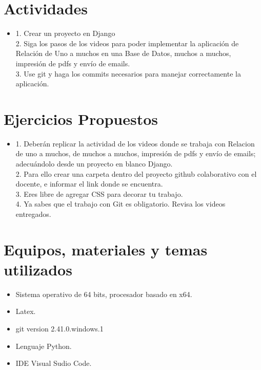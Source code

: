 \documentclass{article}
\begin{document}
	\section{Actividades}
	\begin{itemize}		
		\item 1. Crear un proyecto en Django\\
		2. Siga los pasos de los videos para poder implementar la aplicación de Relación de Uno a muchos en una Base de Datos, muchos a muchos, impresión de pdfs y envío de emails.\\
		3. Use git y haga los commits necesarios para manejar correctamente la aplicación.\\
		
		
	\end{itemize}
	
	\section{Ejercicios Propuestos}
	\begin{itemize}	
	
		\item 1. Deberán replicar la actividad de los videos donde se trabaja con Relacion de uno a muchos, de muchos a muchos, impresión de pdfs y envío de emails;  adecuándolo desde un proyecto en blanco Django.\\
		2. Para ello crear una carpeta dentro del proyecto github colaborativo con el docente, e informar el link donde se encuentra.\\
		3. Eres libre de agregar CSS para decorar tu trabajo.\\
		4. Ya sabes que el trabajo con Git es obligatorio.  Revisa los videos entregados.
		
		
	\end{itemize}
	
	\section{Equipos, materiales y temas utilizados}
	\begin{itemize}
		\item Sistema operativo de 64 bits, procesador basado en x64.
		\item Latex. 
		\item git version 2.41.0.windows.1
		\item Lenguaje Python.
		\item IDE Visual Sudio Code.
	\end{itemize}
\end{document}
